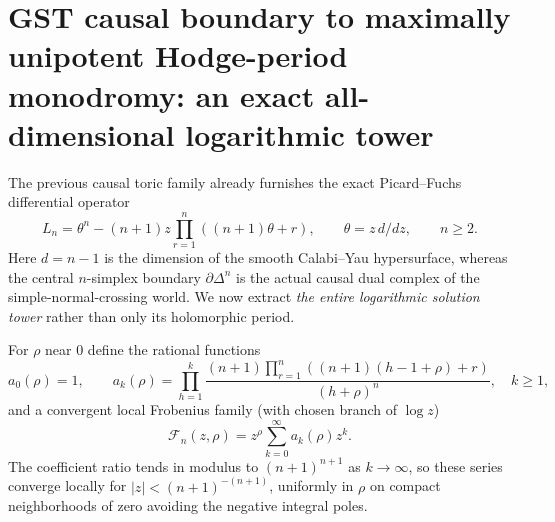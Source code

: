 \documentclass[11pt]{article}
\begin{document}
\section{GST causal boundary to maximally unipotent Hodge-period monodromy:
an exact all-dimensional logarithmic tower}

The previous causal toric family already furnishes the exact
Picard--Fuchs differential operator
\[
 L_n=\theta^n-(n+1)z\prod_{r=1}^{n}((n+1)\theta+r),
 \qquad \theta=z\,d/dz,\qquad n\ge2.
\]
Here $d=n-1$ is the dimension of the smooth Calabi--Yau
hypersurface, whereas the central $n$-simplex boundary
$\partial\Delta^n$ is the actual causal dual complex of the
simple-normal-crossing world. We now extract \emph{the entire
logarithmic solution tower} rather than only its holomorphic period.

For $\rho$ near $0$ define the rational functions
\[
 a_0(\rho)=1,\qquad
 a_k(\rho)=\prod_{h=1}^{k}
 \frac{(n+1)\prod_{r=1}^{n}((n+1)(h-1+\rho)+r)}
 {(h+\rho)^n},
 \quad k\ge1,
\]
and a convergent local Frobenius family (with chosen branch of
$\log z$)
\[
 \mathcal F_n(z,\rho)=z^\rho
 \sum_{k=0}^{\infty}a_k(\rho)z^k.
\]
The coefficient ratio tends in modulus to $(n+1)^{n+1}$ as
$k\to\infty$, so these series converge locally for
$|z|<(n+1)^{-(n+1)}$, uniformly in $\rho$ on compact neighborhoods
of zero avoiding the negative integral poles.
\end{document}
